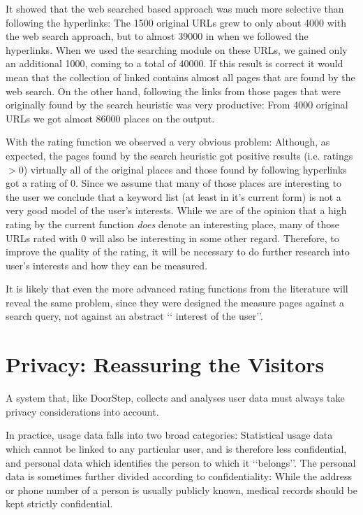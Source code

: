\documentclass[a4paper]{danarticle}
\theoremstyle{remark}
\begin{document}
      It showed that the web searched based approach was much more selective
      than following the hyperlinks: The 1500 original URLs grew to only about 
      4000
      with the web search approach, but to almost 39000 in when we followed the
      hyperlinks. When we used the searching module on these URLs, we gained
      only an additional 1000, coming to a total of 40000. If this result is
      correct it would mean that the collection of linked contains almost all
      pages that are found by the web search. On the other hand, following the
      links from those pages that were originally found by the search heuristic
      was very productive: From 4000 original URLs we got almost 86000 places on
      the output.
      
      With the rating function we observed a very obvious problem: Although, as
      expected, the pages found by the search heuristic got positive results
      (i.e. ratings $ > 0 $) virtually all of the original places and those
      found by following hyperlinks got a rating of 0. Since we assume that many
      of those places are interesting to the user we conclude that a keyword
      list (at least in it's current form) is not a very good model of the
      user's interests. While we are of the opinion that a high rating by the
      current function \emph{does} denote an interesting place, many of those
      URLs rated with 0 will also be interesting in some other regard.
      Therefore, to improve the quality of the rating, it will be necessary to
      do further research into user's interests and how they can be measured.
      
      It is likely that even the more advanced rating functions from the
      literature will reveal the same problem, since they were designed the
      measure pages against a search query, not against an abstract \lq\lq
      interest of the user\rq\rq .
  \section{Privacy: Reassuring the Visitors}
    A system that, like DoorStep, collects and analyses user data must always 
    take privacy considerations into account. 
    
    In practice, usage data falls into two broad categories: Statistical usage 
    data which cannot be linked to any particular user, and is therefore less 
    confidential, and personal data which identifies the 
    person to which it \lq\lq belongs\rq\rq . The personal data is 
    sometimes further divided according to confidentiality: While the address or 
    phone number of a person is usually publicly known, medical records should 
    be kept strictly confidential. 
    
\end{document}
